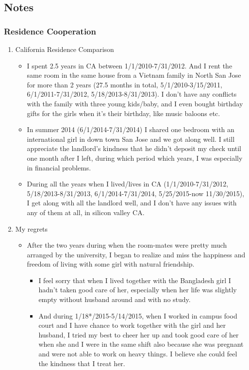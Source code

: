 \documentclass[9pt,b5paper]{article}
\begin{document}
\subsection{Notes}
\label{sec-2-4}
\subsubsection{Residence Cooperation}
\label{sec-2-4-1}
\begin{enumerate}
\item California Residence Comparison
\label{sec-2-4-1-1}
\begin{itemize}
\item I spent 2.5 years in CA between 1/1/2010-7/31/2012. And I rent the same room in the same house from a Vietnam family in North San Jose for more than 2 years (27.5 months in total, 5/1/2010-3/15/2011, 6/1/2011-7/31/2012, 5/18/2013-8/31/2013). I don't have any conflicts with the family with three young kids/baby, and I even bought birthday gifts for the girls when it's their birthday, like music baloons etc.
\item In summer 2014 (6/1/2014-7/31/2014) I shared one bedroom with an international girl in down town San Jose and we got along well. I still appreciate the landlord's kindness that he didn't deposit my check until one month after I left, during which period which years, I was especially in financial problems.
\item During all the years when I lived/lives in CA (1/1/2010-7/31/2012, 5/18/2013-8/31/2013, 6/1/2014-7/31/2014, 5/25/2015-now 11/30/2015), I get along with all the landlord well, and I don't have any issues with any of them at all, in silicon valley CA.
\end{itemize}
\item My regrets
\label{sec-2-4-1-2}
\begin{itemize}
\item After the two years during when the room-mates were pretty much arranged by the university, I began to realize and miss the happiness and freedom of living with some girl with natural friendship. 
\begin{itemize}
\item I feel sorry that when I lived together with the Bangladesh girl I hadn't taken good care of her, especially when her life was slightly empty without husband around and with no study.
\item And during 1/18*/2015-5/14/2015, when I worked in campus food court and I have chance to work together with the girl and her husband, I tried my best to cheer her up and took good care of her when she and I were in the same shift also because she was pregnant and were not able to work on heavy things. I believe she could feel the kindness that I treat her.
\end{itemize}
\end{itemize}
\end{enumerate}
\end{document}
